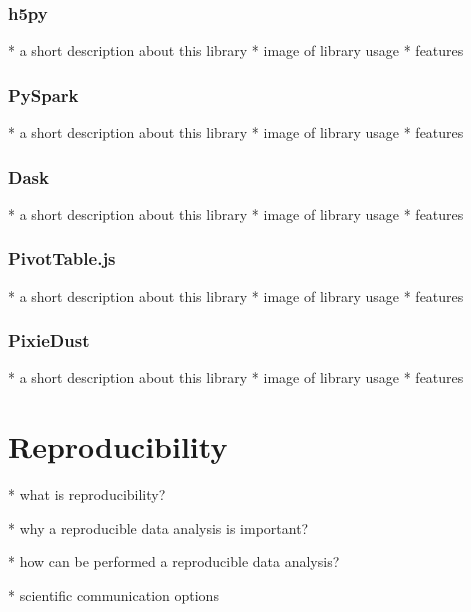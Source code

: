 \documentclass[12pt,a4paper]{amsart}
\numberwithin{equation}{section}
\theoremstyle{plain}
\theoremstyle{definition}
\begin{document}
\subsubsection{h5py}\label{h5py}

* a short description about this library
* image of library usage
* features

\subsubsection{PySpark}\label{pyspark}

* a short description about this library
* image of library usage
* features


\subsubsection{Dask}\label{dask}

* a short description about this library
* image of library usage
* features


\subsubsection{PivotTable.js}\label{pivottablejs}

* a short description about this library
* image of library usage
* features


\subsubsection{PixieDust}\label{pixiedust}

* a short description about this library
* image of library usage
* features



\section{Reproducibility}\label{reproducibility}

* what is reproducibility?

* why a reproducible data analysis is important?

* how can be performed a reproducible data analysis?

* scientific communication options

\end{document}

